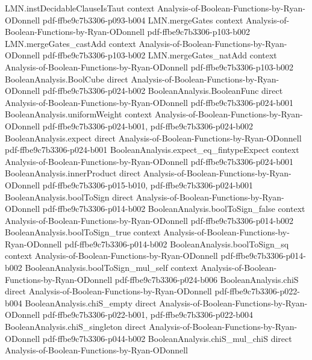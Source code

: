 \begin{theorem}
  {LMN.instDecidableClauseIsTaut}
  {context}
  {Analysis-of-Boolean-Functions-by-Ryan-ODonnell}
  {pdf-ffbe9c7b3306-p093-b004}
\proofstep
  {LMN.mergeGates}
  {context}
  {Analysis-of-Boolean-Functions-by-Ryan-ODonnell}
  {pdf-ffbe9c7b3306-p103-b002}
\proofstep
  {LMN.mergeGates_castAdd}
  {context}
  {Analysis-of-Boolean-Functions-by-Ryan-ODonnell}
  {pdf-ffbe9c7b3306-p103-b002}
\proofstep
  {LMN.mergeGates_natAdd}
  {context}
  {Analysis-of-Boolean-Functions-by-Ryan-ODonnell}
  {pdf-ffbe9c7b3306-p103-b002}
\proofstep
  {BooleanAnalysis.BoolCube}
  {direct}
  {Analysis-of-Boolean-Functions-by-Ryan-ODonnell}
  {pdf-ffbe9c7b3306-p024-b002}
\proofstep
  {BooleanAnalysis.BooleanFunc}
  {direct}
  {Analysis-of-Boolean-Functions-by-Ryan-ODonnell}
  {pdf-ffbe9c7b3306-p024-b001}
\proofstep
  {BooleanAnalysis.uniformWeight}
  {context}
  {Analysis-of-Boolean-Functions-by-Ryan-ODonnell}
  {pdf-ffbe9c7b3306-p024-b001,
    pdf-ffbe9c7b3306-p024-b002}
\proofstep
  {BooleanAnalysis.expect}
  {direct}
  {Analysis-of-Boolean-Functions-by-Ryan-ODonnell}
  {pdf-ffbe9c7b3306-p024-b001}
\proofstep
  {BooleanAnalysis.expect_eq_fintypeExpect}
  {context}
  {Analysis-of-Boolean-Functions-by-Ryan-ODonnell}
  {pdf-ffbe9c7b3306-p024-b001}
\proofstep
  {BooleanAnalysis.innerProduct}
  {direct}
  {Analysis-of-Boolean-Functions-by-Ryan-ODonnell}
  {pdf-ffbe9c7b3306-p015-b010,
    pdf-ffbe9c7b3306-p024-b001}
\proofstep
  {BooleanAnalysis.boolToSign}
  {direct}
  {Analysis-of-Boolean-Functions-by-Ryan-ODonnell}
  {pdf-ffbe9c7b3306-p014-b002}
\proofstep
  {BooleanAnalysis.boolToSign_false}
  {context}
  {Analysis-of-Boolean-Functions-by-Ryan-ODonnell}
  {pdf-ffbe9c7b3306-p014-b002}
\proofstep
  {BooleanAnalysis.boolToSign_true}
  {context}
  {Analysis-of-Boolean-Functions-by-Ryan-ODonnell}
  {pdf-ffbe9c7b3306-p014-b002}
\proofstep
  {BooleanAnalysis.boolToSign_sq}
  {context}
  {Analysis-of-Boolean-Functions-by-Ryan-ODonnell}
  {pdf-ffbe9c7b3306-p014-b002}
\proofstep
  {BooleanAnalysis.boolToSign_mul_self}
  {context}
  {Analysis-of-Boolean-Functions-by-Ryan-ODonnell}
  {pdf-ffbe9c7b3306-p024-b006}
\proofstep
  {BooleanAnalysis.chiS}
  {direct}
  {Analysis-of-Boolean-Functions-by-Ryan-ODonnell}
  {pdf-ffbe9c7b3306-p022-b004}
\proofstep
  {BooleanAnalysis.chiS_empty}
  {direct}
  {Analysis-of-Boolean-Functions-by-Ryan-ODonnell}
  {pdf-ffbe9c7b3306-p022-b001,
    pdf-ffbe9c7b3306-p022-b004}
\proofstep
  {BooleanAnalysis.chiS_singleton}
  {direct}
  {Analysis-of-Boolean-Functions-by-Ryan-ODonnell}
  {pdf-ffbe9c7b3306-p044-b002}
\proofstep
  {BooleanAnalysis.chiS_mul_chiS}
  {direct}
  {Analysis-of-Boolean-Functions-by-Ryan-ODonnell}

\end{theorem}
